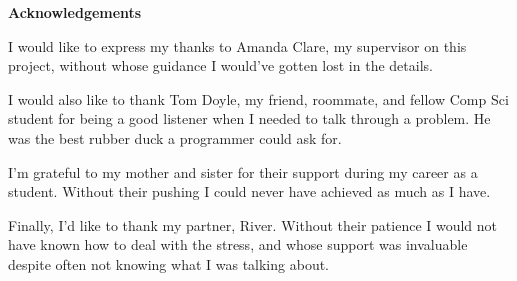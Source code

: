 \thispagestyle{empty}

\begin{center}
    {\LARGE\bf Acknowledgements}
\end{center}

I would like to express my thanks to Amanda Clare, my supervisor on this project, without whose guidance I would've gotten lost in the details.

I would also like to thank Tom Doyle, my friend, roommate, and fellow Comp Sci student for being a good listener when I needed to talk through a problem. He was the best rubber duck a programmer could ask for.

I'm grateful to my mother and sister for their support during my career as a student. Without their pushing I could never have achieved as much as I have.

Finally, I'd like to thank my partner, River. Without their patience I would not have known how to deal with the stress, and whose support was invaluable despite often not knowing what I was talking about.